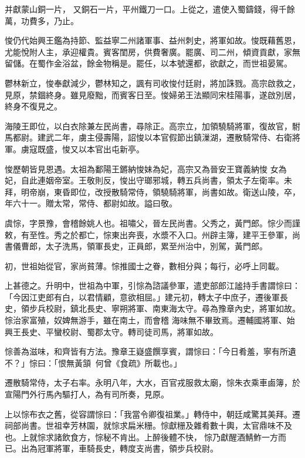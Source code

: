 \begin{pinyinscope}
 并獻蒙山銅一片，
 又銅石一片，平州鐵刀一口。上從之，遣使入蜀鑄錢，得千餘萬，功費多，乃止。



 悛仍代始興王鑑為持節、監益寧二州諸軍事、益州刺史，將軍如故。悛既藉舊恩，尤能悅附人主，承迎權貴。賓客閨房，供費奢廣。罷廣、司二州，傾資貢獻，家無留儲。在蜀作金浴盆，餘金物稱是。罷任，以本號還都，欲獻之，而世祖晏駕。



 鬱林新立，悛奉獻減少，鬱林知之，諷有司收悛付廷尉，將加誅戮。高宗啟救之，見原，禁錮終身。雖見廢黜，而賓客日至。悛婦弟王法顯同宋桂陽事，遂啟別居，終身不復見之。



 海陵王即位，以白衣除兼左民尚書，尋除正。高宗立，加領驍騎將軍，復故官，駙馬都尉。建武二年，虜主侵壽陽，詔悛以本官假節出鎮漅湖，遷散騎常侍、右衛將軍。虜寇既盛，悛又以本官出屯新亭。



 悛歷朝皆見恩遇。太祖為鄱陽王鏘納悛妹為妃，高宗又為晉安王寶義納悛
 女為妃，自此連姻帝室。王敬則反，悛出守瑯邪城，轉五兵尚書，領太子左衛率。未拜，明帝崩，東昏即位，改授散騎常侍，領驍騎將軍，尚書如故。衛送山陵，卒，年六十一。贈太常，常侍、都尉如故。謚曰敬。



 虞悰，字景豫，會稽餘姚人也。祖嘯父，晉左民尚書。父秀之，黃門郎。悰少而謹敕，有至性。秀之於都亡，悰東出奔喪，水漿不入口。州辟主簿，建平王參軍，尚書儀曹郎，太子洗馬，領軍長史，正員郎，累至州治中，別駕，黃門郎。



 初，世祖始從官，家尚貧薄。悰推國士之眷，數相分與；每行，必呼上同載。



 上甚德之。升明中，世祖為中軍，引悰為諮議參軍，遣吏部郎江謐持手書謂悰曰：「今因江吏郎有白，以君情顧，意欲相屈。」建元初，轉太子中庶子，遷後軍長史，領步兵校尉，鎮北長史、寧朔將軍、南東海太守。尋為豫章內史，將軍如故。悰治家富殖，奴婢無游手，雖在南土，而會稽
 海味無不畢致焉。遷輔國將軍、始興王長史、平蠻校尉、蜀郡太守。轉司徒司馬，將軍如故。



 悰善為滋味，和齊皆有方法。豫章王嶷盛饌享賓，謂悰曰：「今日肴羞，寧有所遺不？」悰曰：「恨無黃頷，何曾《食疏》所載也。」



 遷散騎常侍，太子右率。永明八年，大水，百官戎服救太廟，悰朱衣乘車鹵簿，於宣陽門外行馬內驅打人，為有司所奏，見原。



 上以悰布衣之舊，從容謂悰曰：「我當令卿復祖業。」轉侍中，朝廷咸驚其美拜。遷祠部尚書。世祖幸芳林園，就悰求扁米粣。悰獻粣及雜肴數十輿，太官鼎味不及也。上就悰求諸飲食方，悰秘不肯出。上醉後體不快，悰乃獻醒酒鯖鮓一方而已。出為冠軍將軍，車騎長史，轉度支尚書，領步兵校尉。




\end{pinyinscope}
